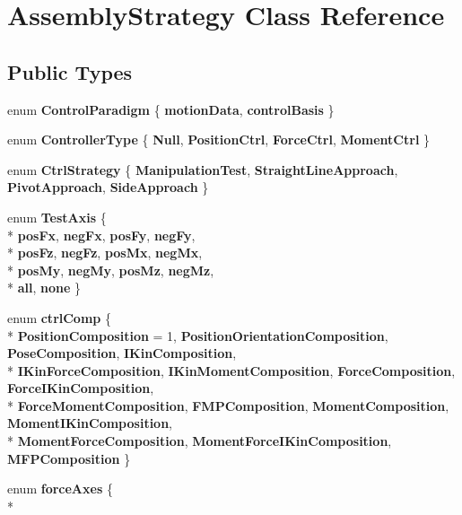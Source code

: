 \hypertarget{classAssemblyStrategy}{\section{Assembly\-Strategy Class Reference}
\label{classAssemblyStrategy}
}
\subsection*{Public Types}
\begin{DoxyCompactItemize}
\item 
enum {\bfseries Control\-Paradigm} \{ {\bfseries motion\-Data}, 
{\bfseries control\-Basis}
 \}
\item 
enum {\bfseries Controller\-Type} \{ {\bfseries Null}, 
{\bfseries Position\-Ctrl}, 
{\bfseries Force\-Ctrl}, 
{\bfseries Moment\-Ctrl}
 \}
\item 
enum {\bfseries Ctrl\-Strategy} \{ {\bfseries Manipulation\-Test}, 
{\bfseries Straight\-Line\-Approach}, 
{\bfseries Pivot\-Approach}, 
{\bfseries Side\-Approach}
 \}
\item 
enum {\bfseries Test\-Axis} \{ \\*
{\bfseries pos\-Fx}, 
{\bfseries neg\-Fx}, 
{\bfseries pos\-Fy}, 
{\bfseries neg\-Fy}, 
\\*
{\bfseries pos\-Fz}, 
{\bfseries neg\-Fz}, 
{\bfseries pos\-Mx}, 
{\bfseries neg\-Mx}, 
\\*
{\bfseries pos\-My}, 
{\bfseries neg\-My}, 
{\bfseries pos\-Mz}, 
{\bfseries neg\-Mz}, 
\\*
{\bfseries all}, 
{\bfseries none}
 \}
\item 
enum {\bfseries ctrl\-Comp} \{ \\*
{\bfseries Position\-Composition} = 1, 
{\bfseries Position\-Orientation\-Composition}, 
{\bfseries Pose\-Composition}, 
{\bfseries I\-Kin\-Composition}, 
\\*
{\bfseries I\-Kin\-Force\-Composition}, 
{\bfseries I\-Kin\-Moment\-Composition}, 
{\bfseries Force\-Composition}, 
{\bfseries Force\-I\-Kin\-Composition}, 
\\*
{\bfseries Force\-Moment\-Composition}, 
{\bfseries F\-M\-P\-Composition}, 
{\bfseries Moment\-Composition}, 
{\bfseries Moment\-I\-Kin\-Composition}, 
\\*
{\bfseries Moment\-Force\-Composition}, 
{\bfseries Moment\-Force\-I\-Kin\-Composition}, 
{\bfseries M\-F\-P\-Composition}
 \}
\item 
enum {\bfseries force\-Axes} \{ \\*

\end{DoxyCompactItemize}
